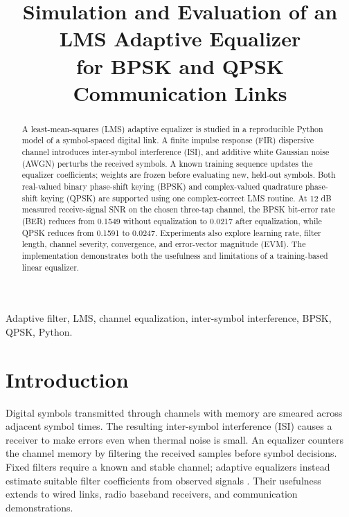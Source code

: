 \documentclass[conference,10pt]{IEEEtran}
\begin{document}
\title{Simulation and Evaluation of an LMS Adaptive Equalizer\\for BPSK and QPSK Communication Links}
\author{
}
\maketitle
\begin{abstract}
A least-mean-squares (LMS) adaptive equalizer is studied in a reproducible Python model of a symbol-spaced digital link. A finite impulse response (FIR) dispersive channel introduces inter-symbol interference (ISI), and additive white Gaussian noise (AWGN) perturbs the received symbols. A known training sequence updates the equalizer coefficients; weights are frozen before evaluating new, held-out symbols. Both real-valued binary phase-shift keying (BPSK) and complex-valued quadrature phase-shift keying (QPSK) are supported using one complex-correct LMS routine. At 12 dB measured receive-signal SNR on the chosen three-tap channel, the BPSK bit-error rate (BER) reduces from 0.1549 without equalization to 0.0217 after equalization, while QPSK reduces from 0.1591 to 0.0247. Experiments also explore learning rate, filter length, channel severity, convergence, and error-vector magnitude (EVM). The implementation demonstrates both the usefulness and limitations of a training-based linear equalizer.
\end{abstract}
\begin{IEEEkeywords}
Adaptive filter, LMS, channel equalization, inter-symbol interference, BPSK, QPSK, Python.
\end{IEEEkeywords}

\section{Introduction}
Digital symbols transmitted through channels with memory are smeared across adjacent symbol times. The resulting inter-symbol interference (ISI) causes a receiver to make errors even when thermal noise is small. An equalizer counters the channel memory by filtering the received samples before symbol decisions. Fixed filters require a known and stable channel; adaptive equalizers instead estimate suitable filter coefficients from observed signals \cite{proakis2007,haykin2002}. Their usefulness extends to wired links, radio baseband receivers, and communication demonstrations.
\end{document}
